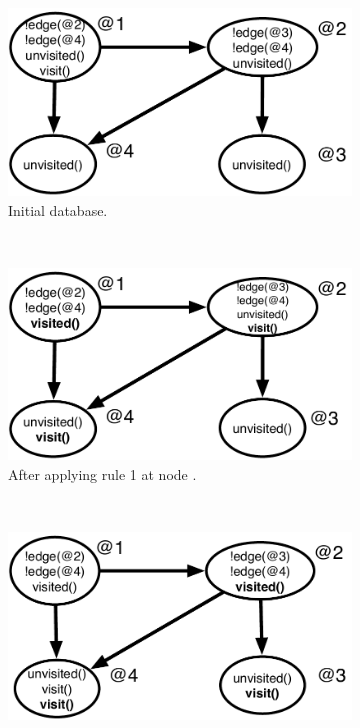 \begin{figure}[h]
        \centering
        \begin{subfigure}[b]{0.5\textwidth}
                \includegraphics[width=\textwidth]{figures/visit/trace1}
                \caption{Initial database.}
                \label{fig:exec_trace1}
        \end{subfigure}%
        ~ %
        \begin{subfigure}[b]{0.5\textwidth}
                \includegraphics[width=\textwidth]{figures/visit/trace2}
                \caption{After applying rule 1 at node .}
                \label{fig:exec_trace2}
        \end{subfigure}\\
        \begin{subfigure}[b]{0.5\textwidth}
                \includegraphics[width=\textwidth]{figures/visit/trace3}

\end{subfigure}
\end{figure}
